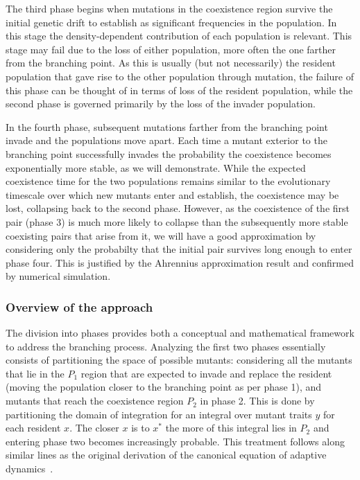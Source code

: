 \documentclass{article}
\begin{document}
The third phase begins when mutations in the coexistence region survive the initial genetic drift to establish as significant frequencies in the population.  In this stage the density-dependent contribution of each population is relevant.  This stage may fail due to the loss of either population, more often the one farther from the branching point.  As this is usually (but not necessarily) the resident population that gave rise to the other population through mutation, the failure of this phase can be thought of in terms of loss of the resident population, while the second phase is governed primarily by the loss of the invader population.  

In the fourth phase, subsequent mutations farther from the branching point invade and the populations move apart.  Each time a mutant exterior to the branching point successfully invades the probability the coexistence becomes exponentially more stable, as we will demonstrate.  While the expected coexistence time for the two populations remains similar to the evolutionary timescale over which new mutants enter and establish, the coexistence may be lost, collapsing back to the second phase.  However, as the coexistence of the first pair (phase 3) is much more likely to collapse than the subsequently more stable coexisting pairs that arise from it, we will have a good approximation by considering only the probabilty that the initial pair survives long enough to enter phase four.  This is justified by the Ahrennius approximation result and confirmed by numerical simulation.


\subsubsection{Overview of the approach}
The division into phases provides both a conceptual and mathematical framework to address the branching process.  Analyzing the first two phases essentially consists of partitioning the space of possible mutants: considering all the mutants that lie in the $P_1$ region that are expected to invade and replace the resident (moving the population closer to the branching point as per phase 1), and mutants that reach the coexistence region $P_2$ in phase 2.  This is done by partitioning the domain of integration for an integral over mutant traits $y$ for each resident $x$.  The closer $x$ is to $x^*$ the more of this integral lies in $P_2$ and entering phase two becomes increasingly probable.  This treatment follows along similar lines as the original derivation of the canonical equation of adaptive dynamics~\citep{dieckmann_jmb1996}.  
\end{document}
